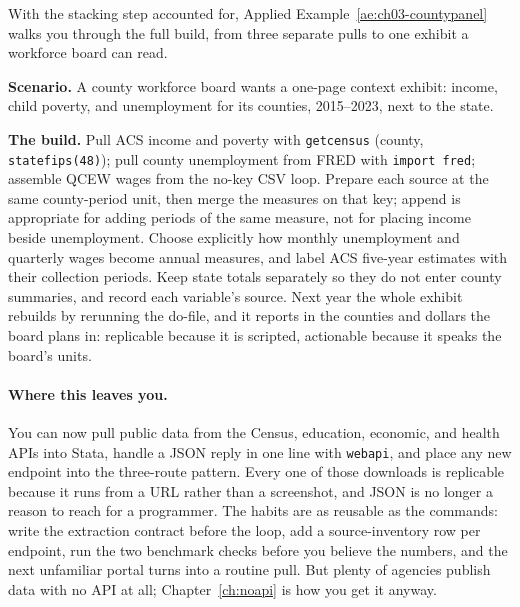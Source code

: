 With the stacking step accounted for, Applied Example~\ref{ae:ch03-countypanel} walks you through the full build, from three separate pulls to one exhibit a workforce board can read.

\aeNoFloat
\begin{appliedexample}\label{ae:ch03-countypanel}
\textbf{Scenario.} A county workforce board wants a one-page context exhibit: income, child poverty, and unemployment for its counties, 2015--2023, next to the state.

\medskip
\textbf{The build.} Pull ACS income and poverty with \texttt{getcensus} (county, \texttt{statefips(48)}); pull county unemployment from FRED with \texttt{import fred}; assemble QCEW wages from the no-key CSV loop. Prepare each source at the same county-period unit, then merge the measures on that key; append is appropriate for adding periods of the same measure, not for placing income beside unemployment. Choose explicitly how monthly unemployment and quarterly wages become annual measures, and label ACS five-year estimates with their collection periods. Keep state totals separately so they do not enter county summaries, and record each variable's source. Next year the whole exhibit rebuilds by rerunning the do-file, and it reports in the counties and dollars the board plans in: replicable because it is scripted, actionable because it speaks the board's units.
\end{appliedexample}

\paragraph{Where this leaves you.} You can now pull public data from the Census, education, economic, and health APIs into Stata, handle a JSON reply in one line with \texttt{webapi}, and place any new endpoint into the three-route pattern. Every one of those downloads is replicable because it runs from a URL rather than a screenshot, and JSON is no longer a reason to reach for a programmer. The habits are as reusable as the commands: write the extraction contract before the loop, add a source-inventory row per endpoint, run the two benchmark checks before you believe the numbers, and the next unfamiliar portal turns into a routine pull. But plenty of agencies publish data with no API at all; Chapter~\ref{ch:noapi} is how you get it anyway.

